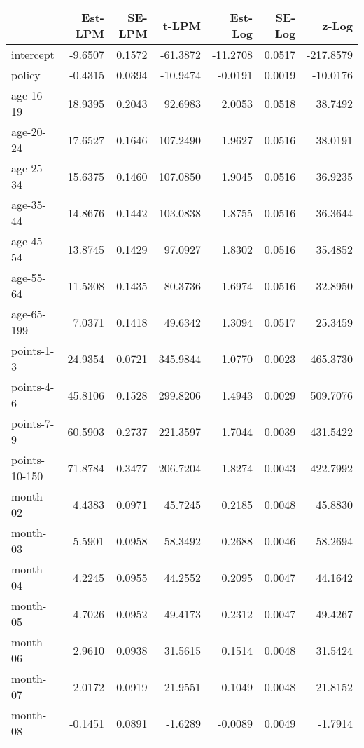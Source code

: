 \documentclass[10pt]{article}
\begin{document}
\begin{table}[ht]
\centering
\begin{tabular}{lrrrrrr}
  \hline
 & Est-LPM & SE-LPM & t-LPM & Est-Log & SE-Log & z-Log \\ 
  \hline
intercept & -9.6507 & 0.1572 & -61.3872 & -11.2708 & 0.0517 & -217.8579 \\ 
  policy & -0.4315 & 0.0394 & -10.9474 & -0.0191 & 0.0019 & -10.0176 \\ 
  age-16-19 & 18.9395 & 0.2043 & 92.6983 & 2.0053 & 0.0518 & 38.7492 \\ 
  age-20-24 & 17.6527 & 0.1646 & 107.2490 & 1.9627 & 0.0516 & 38.0191 \\ 
  age-25-34 & 15.6375 & 0.1460 & 107.0850 & 1.9045 & 0.0516 & 36.9235 \\ 
  age-35-44 & 14.8676 & 0.1442 & 103.0838 & 1.8755 & 0.0516 & 36.3644 \\ 
  age-45-54 & 13.8745 & 0.1429 & 97.0927 & 1.8302 & 0.0516 & 35.4852 \\ 
  age-55-64 & 11.5308 & 0.1435 & 80.3736 & 1.6974 & 0.0516 & 32.8950 \\ 
  age-65-199 & 7.0371 & 0.1418 & 49.6342 & 1.3094 & 0.0517 & 25.3459 \\ 
  points-1-3 & 24.9354 & 0.0721 & 345.9844 & 1.0770 & 0.0023 & 465.3730 \\ 
  points-4-6 & 45.8106 & 0.1528 & 299.8206 & 1.4943 & 0.0029 & 509.7076 \\ 
  points-7-9 & 60.5903 & 0.2737 & 221.3597 & 1.7044 & 0.0039 & 431.5422 \\ 
  points-10-150 & 71.8784 & 0.3477 & 206.7204 & 1.8274 & 0.0043 & 422.7992 \\ 
  month-02 & 4.4383 & 0.0971 & 45.7245 & 0.2185 & 0.0048 & 45.8830 \\ 
  month-03 & 5.5901 & 0.0958 & 58.3492 & 0.2688 & 0.0046 & 58.2694 \\ 
  month-04 & 4.2245 & 0.0955 & 44.2552 & 0.2095 & 0.0047 & 44.1642 \\ 
  month-05 & 4.7026 & 0.0952 & 49.4173 & 0.2312 & 0.0047 & 49.4267 \\ 
  month-06 & 2.9610 & 0.0938 & 31.5615 & 0.1514 & 0.0048 & 31.5424 \\ 
  month-07 & 2.0172 & 0.0919 & 21.9551 & 0.1049 & 0.0048 & 21.8152 \\ 
  month-08 & -0.1451 & 0.0891 & -1.6289 & -0.0089 & 0.0049 & -1.7914 \\ 

\end{tabular}
\end{table}
\end{document}
